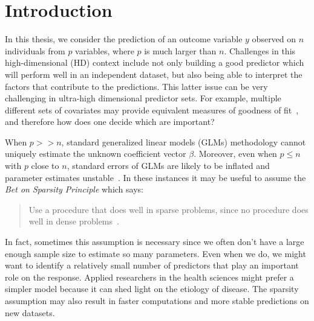 \chapter{Introduction\label{ch:introduction}}


In this thesis, we consider the prediction of an outcome variable $y$ observed on $n$ individuals from $p$ variables, where $p$ is much larger than $n$. 
Challenges in this high-dimensional (HD) context include not only building a good predictor which will perform well in an independent dataset, but also being able to interpret the factors that contribute to the predictions. 
This latter issue can be very challenging in ultra-high dimensional predictor sets. 
For example, multiple different sets of covariates may provide equivalent measures of goodness of fit~\citep{fan2014challenges}, and therefore how does one decide which are important? 

When $p >>n$, standard generalized linear models (GLMs) methodology cannot uniquely estimate the unknown coefficient vector $\beta$. 
Moreover, even when $p \leq n$ with $p$ close to $n$, standard errors of GLMs are likely to be inflated and parameter estimates unstable~\citep{reid2016study}. In these instances it may be useful to assume the \textit{Bet on Sparsity Principle} which says:
\begin{quote}
Use a procedure that does well in sparse problems,
since no procedure does well in dense problems~\citep{friedman2001elements}.
\end{quote}
In fact, sometimes this assumption is necessary since we often don't have a large enough sample size to estimate so many parameters. Even when we do, we might want to identify a relatively small number of predictors that play an important role on the response. Applied researchers in the health sciences might prefer a simpler model because it can shed light on the etiology of disease. The sparsity assumption may also result in faster computations and more stable predictions on new datasets. 

